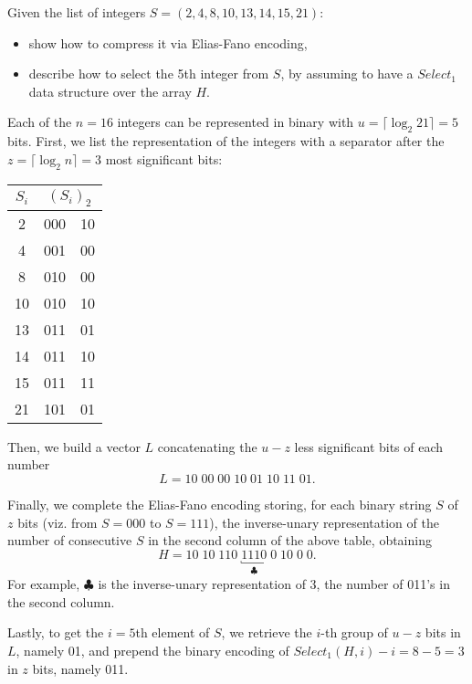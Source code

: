 \exercise

Given the list of integers $S=(2,4,8,10,13,14,15,21)$:
%
\begin{itemize}
  \item show how to compress it via Elias-Fano encoding,
  \item describe how to select the 5th integer from $S$, by assuming to have a $Select_1$ data structure over the array $H$.
\end{itemize}

\solution
\label{09_posting_compression:elias}

Each of the $n=16$ integers can be represented in binary with $u=\lceil\log_2
21\rceil=5$ bits. First, we list the representation of the integers with a
separator after the $z=\lceil\log_2n\rceil=3$ most significant bits:
%
\begin{center}
  \begin{tabular}{ c | r | l }
    $S_i$ & \multicolumn{2}{c}{$(S_i)_2$} \\ \hline
     2 & 000 & 10 \\
     4 & 001 & 00 \\
     8 & 010 & 00 \\
    10 & 010 & 10 \\
    13 & 011 & 01 \\
    14 & 011 & 10 \\
    15 & 011 & 11 \\
    21 & 101 & 01
  \end{tabular}
\end{center}
%
Then, we build a vector  $L$ concatenating the $u-z$ less significant bits of
each number
%
$$L = 10\; 00\; 00\; 10\; 01\; 10\; 11\; 01.$$

Finally, we complete the Elias-Fano encoding storing, for each binary string $S$
of $z$ bits (viz. from $S=000$ to $S=111$), the inverse-unary representation of
the number of consecutive $S$ in the second column of the above table, obtaining
%
$$H=10\;10\;110\;\underbracket{1110}_{\clubsuit}\;0\;10\;0\;0.$$
%
For example, $\clubsuit$ is the inverse-unary representation of 3, the number of
011's in the second column.

Lastly, to get the $i=5$th element of $S$, we retrieve the $i$-th group of $u-z$
bits in $L$, namely 01, and prepend the binary encoding of $Select_1(H,
i)-i=8-5=3$ in $z$ bits, namely 011.
